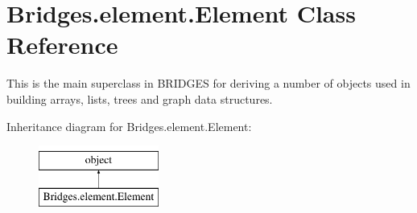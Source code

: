 \hypertarget{class_bridges_1_1element_1_1_element}{}\section{Bridges.\+element.\+Element Class Reference}
\label{class_bridges_1_1element_1_1_element}


This is the main superclass in B\+R\+I\+D\+G\+E\+S for deriving a number of objects used in building arrays, lists, trees and graph data structures.  


Inheritance diagram for Bridges.\+element.\+Element\+:\begin{figure}[H]
\begin{center}
\leavevmode
\includegraphics[height=2.000000cm]{class_bridges_1_1element_1_1_element}
\end{center}
\end{figure}
